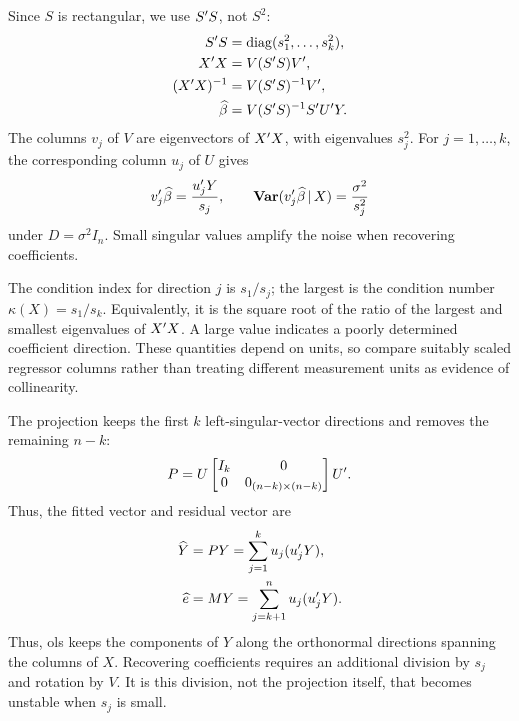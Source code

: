 \documentclass[a4paper,12pt]{article}
\begin{document}
Since $S$ is rectangular, we use $S^{\prime} S$, not $S^2$:
\begin{align*}
	S^{\prime} S&=\operatorname{diag}(s_1^2,\ldots,s_k^2),\\
	X^{\prime} X&=V(S^{\prime} S)V^{\prime},\\
	(X^{\prime} X)^{-1}&=V(S^{\prime} S)^{-1} V^{\prime},\\
	\widehat\beta&=V(S^{\prime} S)^{-1} S^{\prime} U^{\prime} Y.
\end{align*}
The columns $v_j$ of $V$ are eigenvectors of $X^{\prime} X$, with eigenvalues $s_j^2$.
For $j=1,\ldots,k$, the corresponding column $u_j$ of $U$ gives
\begin{align}\label{eq-svd-coefficients}
	v_j^{\prime}\widehat\beta=\frac{u_j^{\prime} Y}{s_j},
	\qquad
	\operatorname{\text{\textrm{\upshape\textbf{Var}}}}(v_j^{\prime}\widehat\beta\mathpunct{}|\mathpunct{} X)=\frac{\sigma^2}{s_j^2}
\end{align}
under $D=\sigma^2 I_n$.
Small singular values amplify the noise when recovering coefficients.

\begin{remark}
	The condition index for direction $j$ is $s_1/s_j$;
	the largest is the condition number $\kappa(X)=s_1/s_k$.
	Equivalently, it is the square root of the ratio of the largest and smallest eigenvalues of $X^{\prime} X$.
	A large value indicates a poorly determined coefficient direction.
	These quantities depend on units, so compare suitably scaled regressor columns rather than treating different measurement units as evidence of collinearity.
\end{remark}

\begin{remark}
	The projection keeps the first $k$ left-singular-vector directions and removes the remaining $n-k$:
	\begin{align*}
		P=U\begin{bmatrix}I_k&0\\0&0_{(n-k)\times(n-k)}\end{bmatrix}U^{\prime}.
	\end{align*}
	Thus, the fitted vector and residual vector are
	\begin{align*}
		\widehat Y&=PY=\sum_{j=1}^k u_j(u_j^{\prime} Y),\\
		\widehat e&=MY=\sum_{j=k+1}^n u_j(u_j^{\prime} Y).
	\end{align*}
	Thus, \gls{ols} keeps the components of $Y$ along the orthonormal directions spanning the columns of $X$.
	Recovering coefficients requires an additional division by $s_j$ and rotation by $V$.
	It is this division, not the projection itself, that becomes unstable when $s_j$ is small.
\end{remark}
\end{document}
